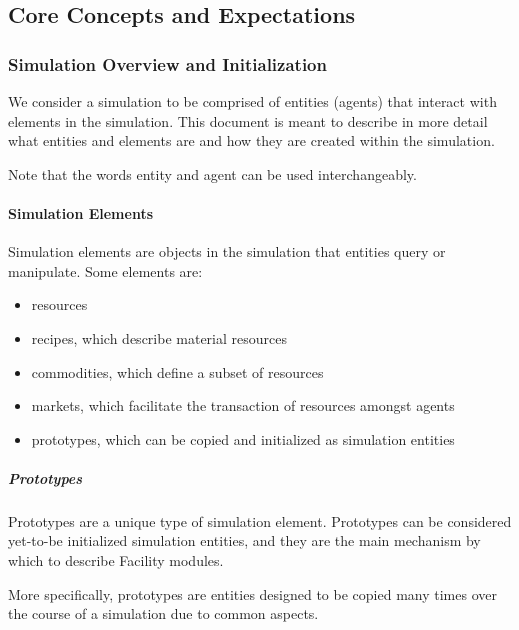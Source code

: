 \documentclass[letterpaper,10pt,english]{sphinxmanual}
\begin{document}
\subsection{Core Concepts and Expectations}
\label{devdoc/main:core-concepts-and-expectations}

\subsubsection{Simulation Overview and Initialization}
\label{devdoc/sim_init::doc}\label{devdoc/sim_init:simulation-overview-and-initialization}
We consider a simulation to be comprised of entities (agents) that
interact with elements in the simulation. This document is meant to
describe in more detail what entities and elements are and how they are
created within the simulation.

Note that the words entity and agent can be used interchangeably.


\paragraph{Simulation Elements}
\label{devdoc/sim_init:simulation-elements}
Simulation elements are objects in the simulation that entities query
or manipulate. Some elements are:
\begin{itemize}
\item {} 
resources

\item {} 
recipes, which describe material resources

\item {} 
commodities, which define a subset of resources

\item {} 
markets, which facilitate the transaction of resources amongst agents

\item {} 
prototypes, which can be copied and initialized as simulation entities

\end{itemize}


\subparagraph{Prototypes}
\label{devdoc/sim_init:prototypes}
Prototypes are a unique type of simulation element. Prototypes can be
considered yet-to-be initialized simulation entities, and they are the
main mechanism by which to describe Facility modules.

More specifically, prototypes are entities designed to be copied
many times over the course of a simulation due to common aspects.
\end{document}
